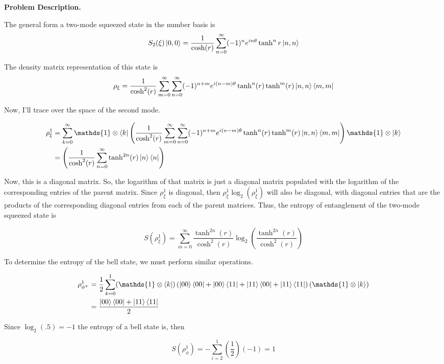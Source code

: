\begin{homeworkProblem}

\textbf{Problem Description.}

The general form a two-mode squeezed state in the number basis is
\[
   S_{2}(\xi)\ket{0,0} = \frac{1}{\cosh(r)}
   \sum^{\infty}_{n=0} (-1)^{n} e^{i n \theta} \tanh^{n}r \ket{n,n}
\]

The density matrix representation of this state is
\[
   \rho_{\xi} = \frac{1}{\cosh^{2}(r)} \sum^{\infty}_{m=0} \sum^{\infty}_{n=0}
   (-1)^{n+m}e^{i (n-m) \theta} \tanh^{n}(r) \tanh^{m}(r) \ket{n,n}\bra{m,m}
\]

Now, I'll trace over the space of the second mode.

\begin{align}
   \rho_{\xi}^{1} &= \sum^{\infty}_{k = 0} \mathds{1} \otimes \bra{k}
   \left(
   \frac{1}{\cosh^{2}(r)} \sum^{\infty}_{m=0} \sum^{\infty}_{n=0}
   (-1)^{n+m}e^{i (n-m) \theta} \tanh^{n}(r) \tanh^{m}(r) \ket{n,n}\bra{m,m}
   \right)
   \mathds{1} \otimes \ket{k} \\
   &=
   \left(
   \frac{1}{\cosh^{2}(r)} \sum^{\infty}_{n=0} \tanh^{2n}(r) \ket{n}\bra{n}
   \right)
\end{align}

Now, this is a diagonal matrix. So, the logarithm of that matrix is just a
diagonal matrix populated with the logarithm of the corresponding entries of the
parent matrix. Since $ \rho_{\xi}^{1} $ is diagonal, then $ \rho_{\xi}^{1}
\log_{2}(\rho_{\xi}^{1}) $ will also be diagonal, with diagonal entries that are
the products of the corresponding diagonal entries from each of the parent
matrices. Thus, the entropy of entanglement of the two-mode squeezed state is

\[
   S(\rho_{\xi}^{1}) = \sum^{\infty}_{m=0} \frac{\tanh^{2n}(r)}{\cosh^{2}(r)}
   \log_{2}\left(\frac{\tanh^{2n}(r)}{\cosh^{2}(r)}\right)
\]


To determine the entropy of the bell state, we must perform similar operations.

\begin{align}
   \rho_{\phi^{+}}^{1} &= \frac{1}{2} \sum^{1}_{k=0}
   (\mathds{1} \otimes \bra{k})
   \left( \ket{00}\bra{00} + \ket{00}\bra{11} +
   \ket{11}\bra{00} + \ket{11}\bra{11} \right)
   (\mathds{1} \otimes \ket{k}) \\
   &= \frac{\ket{00}\bra{00} + \ket{11}\bra{11}}{2}
\end{align}

Since $ \log_{2}(.5) = -1 $ the entropy of a bell state is, then

\[
   S(\rho_{\phi}^{1}) = - \sum^{1}_{i=2} (\frac{1}{2})(-1) = 1
\]

\end{homeworkProblem}
